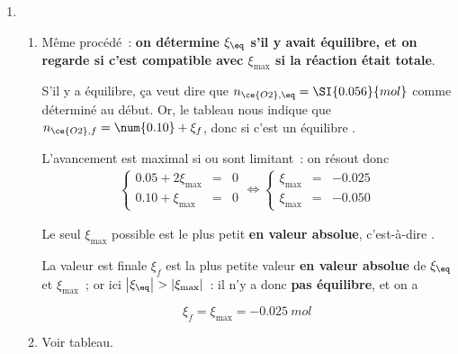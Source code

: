 \documentclass[a4paper, 12pt, final, garamond]{book}
\begin{document}
\begin{enumerate}[resume]
    \item[]
        \begin{enumerate}[start=3]

            \item Même procédé~: \textbf{on détermine $\xi_{\eq}$ s'il y
                    avait équilibre, et on regarde si c'est compatible avec
                $\xi_{\max}$ si la réaction était totale}.\bigbreak

                S'il y a équilibre, ça veut dire que $n_{\ce{O2}, \eq} =
                \SI{0.056}{mol}$ comme déterminé au début. Or, le tableau nous
                indique que $n_{\ce{O2}, f} = \num{0.10} + \xi_f$, donc si c'est
                un équilibre .\bigbreak

                L'avancement est maximal si  ou  sont limitant~:
                on résout donc
                \begin{gather*}
                    \left\{
                        \begin{array}{rcl}
                            \num{0.05}+2\xi_{\max} & = & 0\\
                            \num{0.10}+\xi_{\max} & = & 0
                        \end{array}
                    \right.
                    \Longleftrightarrow
                    \left\{
                        \begin{array}{rcl}
                            \xi_{\max} & = & -\num{0.025}\\
                            \xi_{\max} & = & -\num{0.050}
                        \end{array}
                    \right.
                \end{gather*}

                Le seul $\xi_{\max}$ possible est le plus petit \textbf{en
                valeur absolue}, c'est-à-dire .\bigbreak

                La valeur est finale $\xi_f$ est la plus petite valeur
                \textbf{en valeur absolue} de $\xi_{\eq}$ et $\xi_{\max}$~;
                or ici $\left|\xi_{\eq}\right| > \left|\xi_{\max}\right|$~:
                il n'y a donc \textbf{pas équilibre}, et on a

            \[\boxed{\xi_f = \xi_{\max} = -\SI{0.025}{mol}}\]

        \item Voir tableau.
    \end{enumerate}
\end{enumerate}
\end{document}
